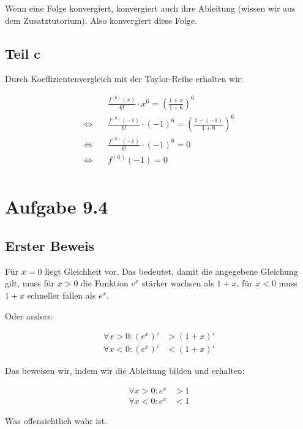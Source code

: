 \documentclass[a4paper,german,12pt,smallheadings]{scrartcl}
\begin{document}
Wenn eine Folge konvergiert, konvergiert auch ihre Ableitung (wissen wir aus
dem Zusatztutorium).  Also konvergiert diese Folge.

\subsection*{Teil c}
Durch Koeffizientenvergleich mit der Taylor-Reihe erhalten wir:

\begin{align*}
  &\frac{f^{(6)}(x)}{6!}\cdot x^6 = \left(\frac{1+x}{1+6}\right)^6 \\
  \Leftrightarrow\quad &\frac{f^{(6)}(-1)}{6!}\cdot (-1)^6 = \left(\frac{1+(-1)}{1+6}\right)^6 \\
  \Leftrightarrow\quad &\frac{f^{(6)}(-1)}{6!}\cdot (-1)^6 = 0 \\
  \Leftrightarrow\quad &f^{(6)}(-1) = 0 \\
\end{align*}

\section*{Aufgabe 9.4}

\subsection*{Erster Beweis}
Für $x=0$ liegt Gleichheit vor. Das bedeutet, damit die angegebene Gleichung
gilt, muss für $x>0$ die Funktion $e^x$ stärker wachsen als $1+x$, für $x<0$
muss $1+x$ schneller fallen als $e^x$.

Oder anders:

\begin{align*}
  \forall x > 0: (e^x)' &> (1+x)' \\
  \forall x < 0: (e^x)' &< (1+x)'
\end{align*}

Das beweisen wir, indem wir die Ableitung bilden und erhalten:

\begin{align*}
  \forall x > 0: e^x &> 1 \\
  \forall x < 0: e^x &< 1
\end{align*}

Was offensichtlich wahr ist.
\end{document}
